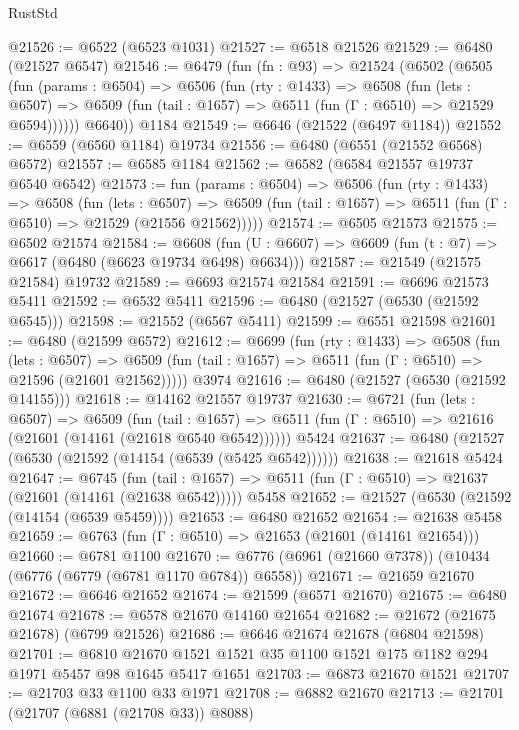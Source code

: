 \begin{lexlean}{RustStd}
\begin{coremodule}
@21526 := @6522 (@6523 @1031)
@21527 := @6518 @21526
@21529 := @6480 (@21527 @6547)
@21546 := @6479
    (fun (fn : @93) =>
    @21524
      (@6502
        (@6505
          (fun (params : @6504) =>
          @6506
            (fun (rty : @1433) =>
            @6508
              (fun (lets : @6507) =>
              @6509 (fun (tail : @1657) => @6511 (fun (Γ : @6510) => @21529 @6594))))))
        @6640))
    @1184
@21549 := @6646 (@21522 (@6497 @1184))
@21552 := @6559 (@6560 @1184) @19734
@21556 := @6480 (@6551 (@21552 @6568) @6572)
@21557 := @6585 @1184
@21562 := @6582 (@6584 @21557 @19737 @6540 @6542)
@21573 := fun (params : @6504) =>
  @6506
    (fun (rty : @1433) =>
    @6508
      (fun (lets : @6507) =>
      @6509 (fun (tail : @1657) => @6511 (fun (Γ : @6510) => @21529 (@21556 @21562)))))
@21574 := @6505 @21573
@21575 := @6502 @21574
@21584 := @6608
    (fun (U : @6607) => @6609 (fun (t : @7) => @6617 (@6480 (@6623 @19734 @6498) @6634)))
@21587 := @21549 (@21575 @21584) @19732
@21589 := @6693 @21574 @21584
@21591 := @6696 @21573 @5411
@21592 := @6532 @5411
@21596 := @6480 (@21527 (@6530 (@21592 @6545)))
@21598 := @21552 (@6567 @5411)
@21599 := @6551 @21598
@21601 := @6480 (@21599 @6572)
@21612 := @6699
    (fun (rty : @1433) =>
    @6508
      (fun (lets : @6507) =>
      @6509 (fun (tail : @1657) => @6511 (fun (Γ : @6510) => @21596 (@21601 @21562)))))
    @3974
@21616 := @6480 (@21527 (@6530 (@21592 @14155)))
@21618 := @14162 @21557 @19737
@21630 := @6721
    (fun (lets : @6507) =>
    @6509
      (fun (tail : @1657) =>
      @6511 (fun (Γ : @6510) => @21616 (@21601 (@14161 (@21618 @6540 @6542))))))
    @5424
@21637 := @6480 (@21527 (@6530 (@21592 (@14154 (@6539 (@5425 @6542))))))
@21638 := @21618 @5424
@21647 := @6745
    (fun (tail : @1657) => @6511 (fun (Γ : @6510) => @21637 (@21601 (@14161 (@21638 @6542)))))
    @5458
@21652 := @21527 (@6530 (@21592 (@14154 (@6539 @5459))))
@21653 := @6480 @21652
@21654 := @21638 @5458
@21659 := @6763 (fun (Γ : @6510) => @21653 (@21601 (@14161 @21654)))
@21660 := @6781 @1100
@21670 := @6776 (@6961 (@21660 @7378)) (@10434 (@6776 (@6779 (@6781 @1170 @6784)) @6558))
@21671 := @21659 @21670
@21672 := @6646 @21652
@21674 := @21599 (@6571 @21670)
@21675 := @6480 @21674
@21678 := @6578 @21670 @14160 @21654
@21682 := @21672 (@21675 @21678) (@6799 @21526)
@21686 := @6646 @21674 @21678 (@6804 @21598)
@21701 := @6810 @21670 @1521 @1521 @35 @1100 @1521 @175 @1182 @294 @1971 @5457 @98 @1645 @5417 @1651
@21703 := @6873 @21670 @1521
@21707 := @21703 @33 @1100 @33 @1971
@21708 := @6882 @21670
@21713 := @21701 (@21707 (@6881 (@21708 @33)) @8088)

\end{coremodule}
\end{lexlean}
